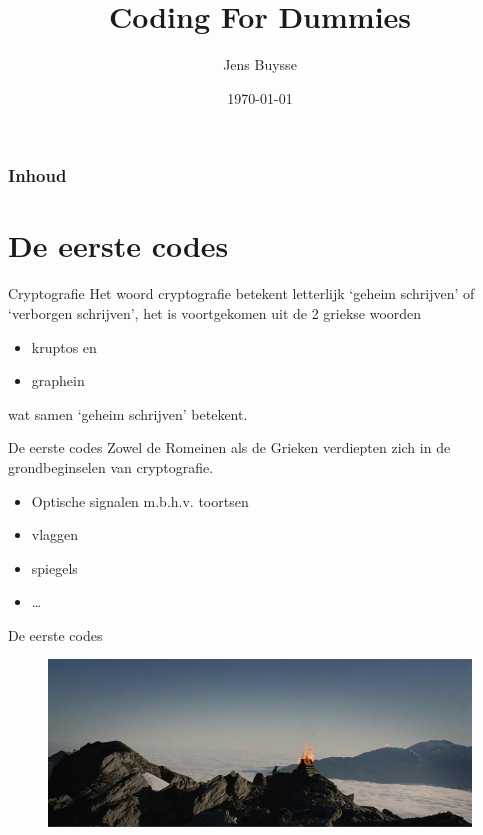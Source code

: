 \documentclass{beamer}
\title[Intro]{Coding For Dummies}
\author{Jens {Buysse}}
\date{\today}
\begin{document}

\HoGentLogo

\titleframe


\begin{frame}
  \frametitle{Inhoud}

  \tableofcontents
\end{frame}

\section{De eerste codes}

\begin{frame}{Cryptografie}
	Het woord \textcolor{HoGentBlue}{cryptografie} betekent letterlijk  \textcolor{HoGentBlue}{‘geheim schrijven’} of  \textcolor{HoGentBlue}{‘verborgen schrijven’}, het is voortgekomen uit de 2 griekse woorden 
	\begin{itemize}
		\item kruptos en
		\item graphein
	\end{itemize}
	 wat samen ‘geheim schrijven’ betekent.
\end{frame}

\begin{frame}{De eerste codes}
	Zowel de Romeinen als de Grieken verdiepten zich in de grondbeginselen van cryptografie. 
	
	\begin{itemize}
		\item Optische signalen m.b.h.v. toortsen
		\item vlaggen
		\item spiegels
		\item \dots
	\end{itemize}
\end{frame}

\begin{frame}{De eerste codes}
	\begin{figure}
		\includegraphics[width=\textwidth]{img/toorts.jpg}
	\end{figure}
\end{frame}
\end{document}
